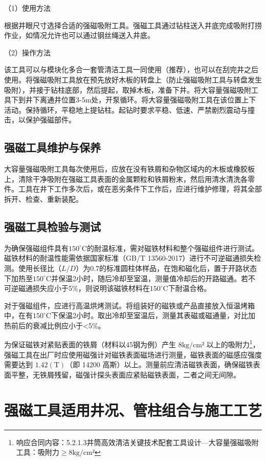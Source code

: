 （1）使用方法

根据井眼尺寸选择合适的强磁吸附工具。强磁工具通过钻柱送入井底完成吸附打捞作业，如情况允许也可以通过钢丝绳送入井底。

（2）操作方法

该工具可以与模块化多合一套管清洁工具一同使用（推荐），也可以在刮完井之后使用。将强磁吸附工具放在预先放好木板的转盘上（防止强磁吸附工具与转盘发生吸附），并接于钻柱底部，然后提起，取掉木板，准备下井。将大容量强磁吸附工具下到井下离通井位置3-5m处，开泵循环。将大容量强磁吸附工具在该位置上下活动。保持循环，平稳地上提钻柱。起钻时要求平稳、低速、严禁剧烈震动与撞击，以保护强磁部件。

\subsection{强磁工具维护与保养}

大容量强磁吸附工具每次使用后，应放在没有铁屑和杂物区域内的木板或橡胶板上，清除干净吸附在强磁工具表面的金属颗粒和铁屑粉末，然后用清水清洗各零件。工具在井下工作多次后，或在恶劣条件下工作后，应进行维护修理，将其全部拆开、检查、重新装配。

\subsection{强磁工具检验与测试}

为确保强磁组件具有$150^{\circ}\mathrm{C}$的耐温标准，需对磁铁材料和整个强磁组件进行测试。磁铁材料的耐温性能需依据国家标准（GB/T 13560-2017）进行不可逆磁通损失检测。使用长径比（$L/D$）为$0.7$的标准圆柱体样品，在饱和磁化后，置于开路状态下加热至$150^{\circ}\mathrm{C}$并保温2小时，随后冷却至室温，测量值冷却后的开路磁通。若不可逆磁通损失应小于5\%，则说明该磁铁材料在$150^{\circ}\mathrm{C}$下耐温合格。

对于强磁组件，应进行高温烘烤测试。将组装好的磁铁或产品直接放入恒温烤箱中，在有$150^{\circ}\mathrm{C}$下保温2小时。取出冷却至室温后，测量其表磁或磁通量，对比加热前后的衰减比例应小于<5\%。

为保证磁铁对紧贴表面的铁屑（材料以45钢为例）产生 $8 \mathrm{kg/cm²}$ 以上的吸附力\footnote{响应合同内容：5.2.1.3井筒高效清洁关键技术配套工具设计---大容量强磁吸附工具：吸附力$\ge 8 \mathrm{kg/cm²}$}，强磁工具在出厂时应使用磁强计对磁铁表面磁场进行测量，磁铁表面的磁感应强度需要达到 $1.42  (\mathrm{T})$（即 14200 高斯）以上。测量前应清洁磁铁表面，确保磁铁表面平整，无铁屑残留，磁强计探头表面应紧贴磁铁表面，二者之间无间隙。


\section{强磁工具适用井况、管柱组合与施工工艺}

